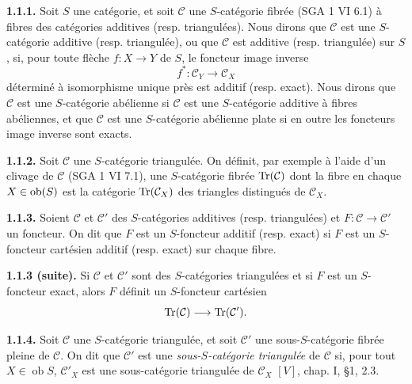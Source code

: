\documentclass[11pt]{article}
\providecommand{\cC}{\mathcal C}
\providecommand{\Coker}{\operatorname{Coker}}
\providecommand{\Ker}{\operatorname{Ker}}
\providecommand{\cO}{\mathcal O}
\begin{document}
\textbf{1.1.1.} Soit \(S\) une catégorie, et soit \(\mathcal C\) une \(S\)-catégorie fibrée (SGA 1 VI 6.1) à fibres des catégories additives (resp. triangulées). Nous dirons que \(\mathcal C\) est une \(S\)-catégorie additive (resp. triangulée), ou que \(\mathcal C\) est additive (resp. triangulée) sur \(S\), si, pour toute flèche \(f:X\to Y\) de \(S\), le foncteur image inverse
\[
  f^*:\mathcal C_Y\longrightarrow \mathcal C_X
\]
déterminé à isomorphisme unique près est additif (resp. exact). Nous dirons que \(\mathcal C\) est une \(S\)-catégorie abélienne si \(\mathcal C\) est une \(S\)-catégorie additive à fibres abéliennes, et que \(\mathcal C\) est une \(S\)-catégorie abélienne plate si en outre les foncteurs image inverse sont exacts.

\textbf{1.1.2.} Soit \(\mathcal C\) une \(S\)-catégorie triangulée. On définit, par exemple à l'aide d'un clivage de \(\mathcal C\) (SGA 1 VI 7.1), une \(S\)-catégorie fibrée \(\operatorname{Tr}(\mathcal C)\) dont la fibre en chaque \(X\in \operatorname{ob}(S)\) est la catégorie \(\operatorname{Tr}(\mathcal C_X)\) des triangles distingués de \(\mathcal C_X\).

\textbf{1.1.3.} Soient \(\mathcal C\) et \(\mathcal C'\) des \(S\)-catégories additives (resp. triangulées) et \(F:\mathcal C\to\mathcal C'\) un foncteur. On dit que \(F\) est un \(S\)-foncteur additif (resp. exact) si \(F\) est un \(S\)-foncteur cartésien additif (resp. exact) sur chaque fibre.



\providecommand{\cC}{\mathcal C}
\providecommand{\cD}{\mathcal D}
\providecommand{\cK}{\mathcal K}
\providecommand{\cO}{\mathcal O}
\providecommand{\cS}{\mathcal S}
\providecommand{\Cpx}{\mathrm C}
\providecommand{\Kpx}{\mathrm K}
\providecommand{\Dpx}{\mathrm D}
\providecommand{\D}{\mathrm D}
\providecommand{\Ho}{\mathrm H}
\providecommand{\Ob}{\operatorname{ob}}
\providecommand{\Coker}{\operatorname{Coker}}
\providecommand{\Ker}{\operatorname{Ker}}
\providecommand{\Im}{\operatorname{Im}}
\providecommand{\Hom}{\operatorname{Hom}}
\providecommand{\Cone}{\operatorname{Cone}}
\providecommand{\id}{\operatorname{Id}}
\providecommand{\qis}{\xrightarrow{\sim}}


\textbf{1.1.3 (suite).} Si \(\mathcal C\) et \(\mathcal C'\) sont des \(S\)-catégories triangulées et si \(F\) est un \(S\)-foncteur exact, alors \(F\) définit un \(S\)-foncteur cartésien
\[
  \operatorname{Tr}(\mathcal C)\longrightarrow \operatorname{Tr}(\mathcal C').
\]

\textbf{1.1.4.} Soit \(\mathcal C\) une \(S\)-catégorie triangulée, et soit \(\mathcal C'\) une sous-\(S\)-catégorie fibrée pleine de \(\mathcal C\). On dit que \(\mathcal C'\) est une \emph{sous-\(S\)-catégorie triangulée} de \(\mathcal C\) si, pour tout \(X\in\Ob S\), \(\mathcal C'_X\) est une sous-catégorie triangulée de \(\mathcal C_X\) \([V]\), chap. I, §1, 2.3.
\end{document}
